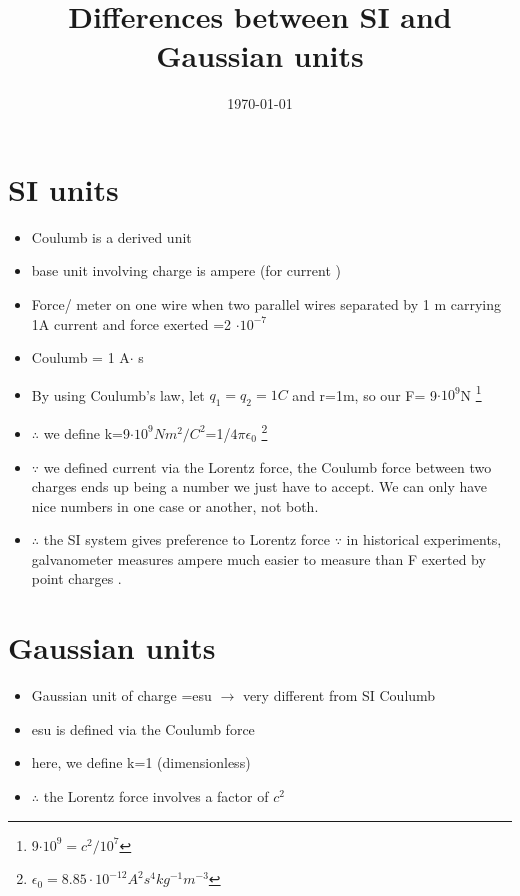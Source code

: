 \documentclass[12 pt , twoside, letterpaper] {article}
\begin{document}
\title {Differences between SI and Gaussian units}
\date {\today}
\maketitle
\section {SI units}
\begin{itemize}
\item Coulumb is a derived unit
\item base unit involving charge is ampere (for current )

\item Force/ meter on one wire when two parallel wires separated by 1 m carrying 1A current and force exerted =2 $ \cdot 10^{-7}$
\item Coulumb = 1 A$\cdot$ s
\item By using Coulumb's law, let $q_1=q_2=1C$ and r=1m, so our F=  9$\cdot 10^{9} $N \footnote{9$\cdot 10^{9}=c^2/ 10 ^7$} 
\item $\therefore$ we define k=9$\cdot 10^{9} N m^2/C^2$=1/$4 \pi \epsilon_0$ \footnote{$\epsilon_0 =8.85 \cdot 10^{-12} A^2 s^4 kg^{-1} m^{-3}$}
\item $\because$ we defined current via the Lorentz force, the Coulumb force between two charges ends up being a number we just have to accept. We can only have nice numbers in one case or another, not both.
\item $\therefore$ the SI system gives preference to Lorentz force  $\because$ in historical experiments, galvanometer measures ampere  much easier to measure than F exerted by point charges .
\end{itemize}
\section{Gaussian units}
\begin{itemize}

\item Gaussian unit of charge =esu $\rightarrow$ very different from SI Coulumb
\item esu is defined via the Coulumb force
\item here, we define k=1 (dimensionless)
\item $\therefore$ the Lorentz force involves a factor of $ c^2$
\end{itemize}
\end{document}
